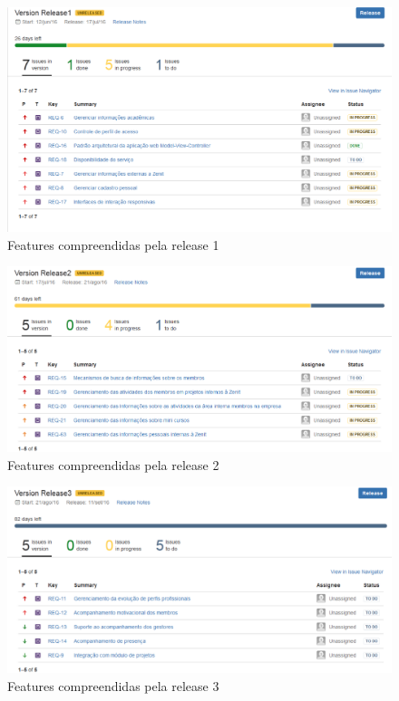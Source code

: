\begin{anexosenv}
\begin{figure}[H]
    \centering
    \includegraphics[keepaspectratio=true,scale=0.5]{figuras/roadmapft1.eps}
    \caption[Release 1 de features]{Features compreendidas pela release 1}
\end{figure}
\begin{figure}[H]
    \centering
    \includegraphics[keepaspectratio=true,scale=0.5]{figuras/roadmapft2.eps}
    \caption[Release 2 de features]{Features compreendidas pela release 2}
\end{figure}
\begin{figure}[H]
    \centering
    \includegraphics[keepaspectratio=true,scale=0.5]{figuras/roadmapft3.eps}
    \caption[Release 3 de features]{Features compreendidas pela release 3}
\end{figure}


\end{anexosenv}
